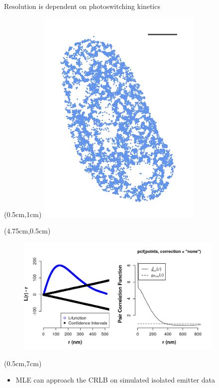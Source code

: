 \documentclass{beamer}					%
\begin{document}
\begin{frame}{Resolution is dependent on photoswitching kinetics}

\begin{textblock*}{4cm}(0.5cm,1cm)
\includegraphics[width=\textwidth]{STORM.png}
\end{textblock*}

\begin{textblock*}{8cm}(4.75cm,0.5cm)
\begin{figure}
\includegraphics[width=10cm]{Spatstat.png}
\end{figure}
\end{textblock*}

\begin{textblock*}{12cm}(0.5cm,7cm)
\begin{itemize}
\item MLE can approach the CRLB on simulated isolated emitter data
\end{itemize}
\end{textblock*}

\end{frame}
\end{document}
